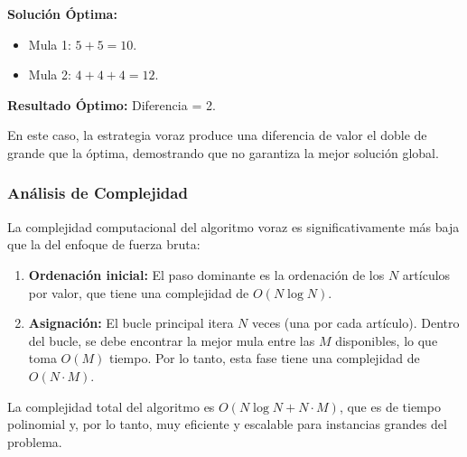 \documentclass[12pt, a4paper]{article}
\begin{document}
    \textbf{Solución Óptima:}
    \begin{itemize}
        \item Mula 1: $5 + 5 = 10$.
        \item Mula 2: $4 + 4 + 4 = 12$.
    \end{itemize}
    \textbf{Resultado Óptimo:} Diferencia = 2.

    En este caso, la estrategia voraz produce una diferencia de valor el doble de grande que la óptima, demostrando que no garantiza la mejor solución global.

    \subsubsection{Análisis de Complejidad}
    La complejidad computacional del algoritmo voraz es significativamente más baja que la del enfoque de fuerza bruta:
    \begin{enumerate}
        \item \textbf{Ordenación inicial:} El paso dominante es la ordenación de los $N$ artículos por valor, que tiene una complejidad de $O(N \log N)$.
        \item \textbf{Asignación:} El bucle principal itera $N$ veces (una por cada artículo). Dentro del bucle, se debe encontrar la mejor mula entre las $M$ disponibles, lo que toma $O(M)$ tiempo. Por lo tanto, esta fase tiene una complejidad de $O(N \cdot M)$.
    \end{enumerate}

    La complejidad total del algoritmo es $O(N \log N + N \cdot M)$, que es de tiempo polinomial y, por lo tanto, muy eficiente y escalable para instancias grandes del problema.
\end{document}

